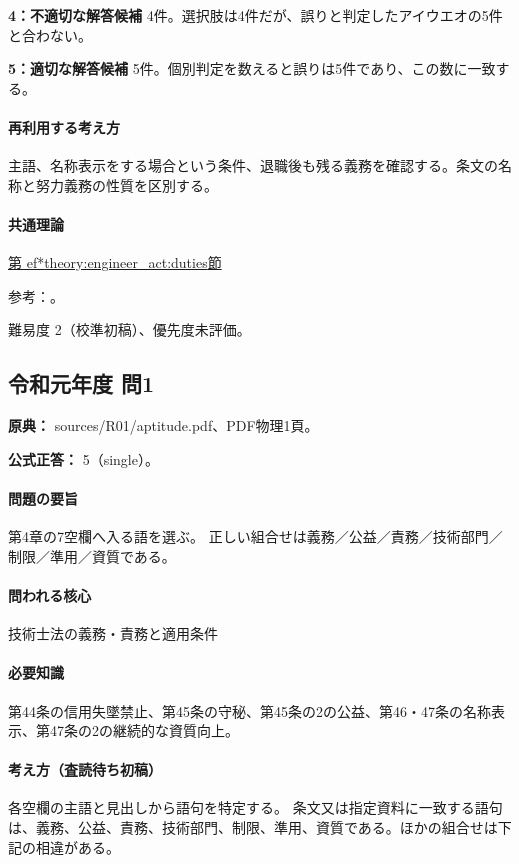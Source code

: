 \noindent\textbf{4：不適切な解答候補} 4件。選択肢は4件だが、誤りと判定したアイウエオの5件と合わない。\par

\noindent\textbf{5：適切な解答候補} 5件。個別判定を数えると誤りは5件であり、この数に一致する。\par

\paragraph{再利用する考え方} 主語、名称表示をする場合という条件、退職後も残る義務を確認する。条文の名称と努力義務の性質を区別する。

\paragraph{共通理論} \hyperref[theory:engineer_act:duties]{第
ef*{theory:engineer_act:duties}節}

\par 参考：\cite{engineer_act_current}。

\par 難易度 2（校準初稿）、優先度未評価。

\subsection{令和元年度 問1}
\label{q:r01-reg-apt-01}

\noindent\textbf{原典：} sources/R01/aptitude.pdf、PDF物理1頁。

\textbf{公式正答：} 5（single）。

\paragraph{問題の要旨} 第4章の7空欄へ入る語を選ぶ。 正しい組合せは義務／公益／責務／技術部門／制限／準用／資質である。

\paragraph{問われる核心} 技術士法の義務・責務と適用条件

\paragraph{必要知識} 第44条の信用失墜禁止、第45条の守秘、第45条の2の公益、第46・47条の名称表示、第47条の2の継続的な資質向上。

\paragraph{考え方（査読待ち初稿）} 各空欄の主語と見出しから語句を特定する。 条文又は指定資料に一致する語句は、義務、公益、責務、技術部門、制限、準用、資質である。ほかの組合せは下記の相違がある。

